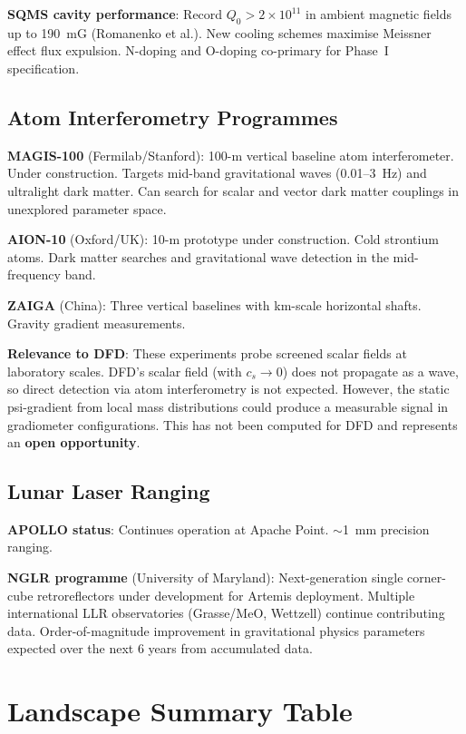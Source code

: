 \documentclass[11pt]{article}
\newcommand{\ee}[1]{\times 10^{#1}}
\begin{document}
\textbf{SQMS cavity performance}: Record $Q_0 > 2\ee{11}$ in ambient
magnetic fields up to 190~mG (Romanenko et al.). New cooling schemes
maximise Meissner effect flux expulsion. N-doping and O-doping
co-primary for Phase~I specification.

\subsection{Atom Interferometry Programmes}

\textbf{MAGIS-100} (Fermilab/Stanford): 100-m vertical baseline atom
interferometer. Under construction. Targets mid-band gravitational
waves (0.01--3~Hz) and ultralight dark matter. Can search for scalar
and vector dark matter couplings in unexplored parameter space.

\textbf{AION-10} (Oxford/UK): 10-m prototype under construction.
Cold strontium atoms. Dark matter searches and gravitational wave
detection in the mid-frequency band.

\textbf{ZAIGA} (China): Three vertical baselines with km-scale
horizontal shafts. Gravity gradient measurements.

\textbf{Relevance to DFD}: These experiments probe screened scalar
fields at laboratory scales. DFD's scalar field (with $c_s \to 0$)
does not propagate as a wave, so direct detection via atom
interferometry is not expected. However, the static psi-gradient
from local mass distributions could produce a measurable signal in
gradiometer configurations. This has not been computed for DFD and
represents an \textbf{open opportunity}.

\subsection{Lunar Laser Ranging}

\textbf{APOLLO status}: Continues operation at Apache Point.
$\sim$1~mm precision ranging.

\textbf{NGLR programme} (University of Maryland): Next-generation
single corner-cube retroreflectors under development for Artemis
deployment. Multiple international LLR observatories (Grasse/MeO,
Wettzell) continue contributing data. Order-of-magnitude improvement
in gravitational physics parameters expected over the next 6 years
from accumulated data.


\section{Landscape Summary Table}
\label{sec:landscape-table}
\end{document}

